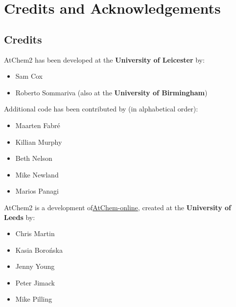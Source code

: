 %
%
%
%

\chapter{Credits and Acknowledgements} \label{ch:credits}

\section{Credits} \label{sec:credits}

AtChem2 has been developed at the \textbf{University of Leicester} by:

\begin{itemize}
\item Sam Cox
\item Roberto Sommariva (also at the \textbf{University of Birmingham})
\end{itemize}

\noindent
Additional code has been contributed by (in alphabetical order):

\begin{itemize}
\item Maarten Fabr{\'e}
\item Killian Murphy
\item Beth Nelson
\item Mike Newland
\item Marios Panagi
\end{itemize}

AtChem2 is a development of\href{https://atchem.leeds.ac.uk/webapp/}{AtChem-online},
created at the \textbf{University of Leeds} by:

\begin{itemize}
\item Chris Martin
\item Kasia Boro{\'n}ska
\item Jenny Young
\item Peter Jimack
\item Mike Pilling
\end{itemize}

